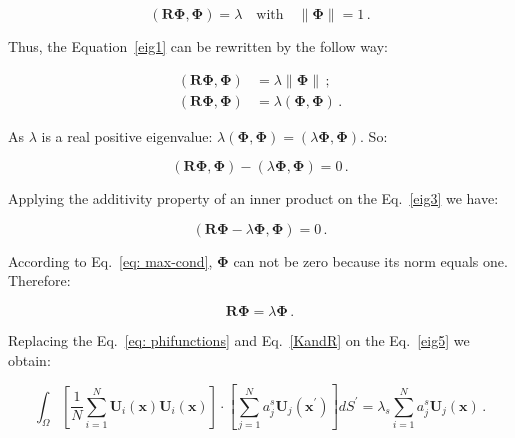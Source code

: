 \documentclass[12pt,a4paper]{article}
\newcommand{\bv}[1]{\mathbf{#1}}
\newcommand{\xp}{x^{\mathbf{\prime}}}
\begin{document}
\begin{equation}\label{eig1}
 \left(\bv{R} \bv{\Phi} , \bv{\Phi} \right) = \lambda \quad \text{with} \quad \parallel \bv{\Phi} \parallel = 1 \,.
\end{equation}


Thus, the Equation~\eqref{eig1} can be rewritten by the follow way:


\begin{equation}\label{eig2}
 \begin{split}
 \left(\bv{R} \bv{\Phi} , \bv{\Phi} \right) &= \lambda \parallel \bv{\Phi} \parallel \,; \\
 \left(\bv{R} \bv{\Phi} , \bv{\Phi} \right) &= \lambda \left(\bv{\Phi}, \bv{\Phi} \right) \, .
 \end{split}
\end{equation}


As $\lambda$ is a real positive eigenvalue: $\lambda \left(\bv{\Phi}, \bv{\Phi} \right) = \left(\lambda \bv{\Phi}, \bv{\Phi} \right)$. So:


\begin{equation}\label{eig3}
 \left(\bv{R} \bv{\Phi} , \bv{\Phi} \right) - \left(\lambda \bv{\Phi}, \bv{\Phi} \right) = 0 \,.
\end{equation}


Applying the additivity property of an inner product on the Eq.~\eqref{eig3} we have:


\begin{equation}\label{eig4}
 \left(\bv{R} \bv{\Phi} - \lambda \bv{\Phi}, \bv{\Phi} \right) = 0 \,.
\end{equation}


According to Eq.~\eqref{eq: max-cond}, $\bv{\Phi}$ can not be zero because its norm equals one. Therefore:

\begin{equation}\label{eig5}
 \bv{R} \bv{\Phi} = \lambda \bv{\Phi} \,.
\end{equation}


Replacing the Eq.~\eqref{eq: phifunctions} and Eq.~\eqref{KandR} on the Eq.~\eqref{eig5} we obtain:


\begin{equation} \label{eq: substituting} 
\int_{\Omega}  \left[\frac{1}{N} \sum_{i=1}^{N} \bv{U}_i(\bv{x})\bv{U}_i(\bv{x}) \right] \cdot \left[\sum_{j=1}^{N} a^{s}_{j} \bv{U}_{j}(\bv{\xp}) \right] dS^{\prime} = \lambda_{s} \sum_{i=1}^{N} a^{s}_{j} \bv{U}_{j} (\bv{x}) \,.
\end{equation}
\end{document}
